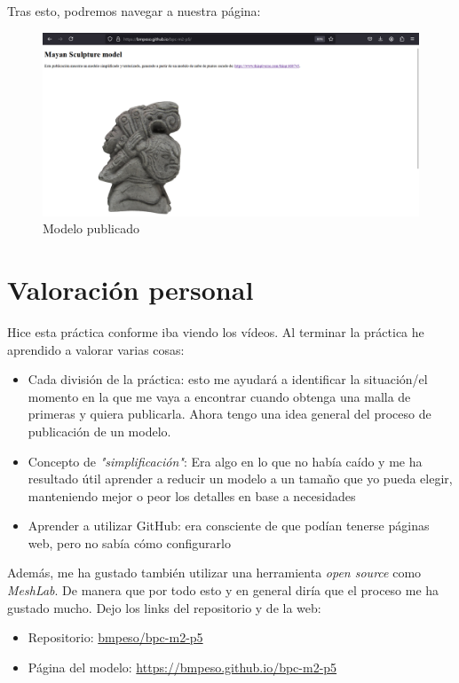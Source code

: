 \documentclass[options]{article}
\begin{document}
Tras esto, podremos navegar a nuestra página:

\begin{figure}[H]
    \centering
    \includegraphics[scale=0.34]{images/publicacion_03.png}
    \caption{Modelo publicado}
\end{figure}
\pagebreak
\section{Valoración personal}

Hice esta práctica conforme iba viendo los vídeos. Al terminar la práctica he aprendido a valorar varias cosas:
\begin{itemize}
    \item Cada división de la práctica: esto me ayudará a identificar la situación/el momento en la que me vaya a encontrar cuando obtenga una malla de primeras y quiera publicarla. Ahora tengo una idea general del proceso de publicación de un modelo.
    \item Concepto de \textit{"simplificación"}: Era algo en lo que no había caído y me ha resultado útil aprender a reducir un modelo a un tamaño que yo pueda elegir, manteniendo mejor o peor los detalles en base a necesidades
    \item Aprender a utilizar GitHub: era consciente de que podían tenerse páginas web, pero no sabía cómo configurarlo
\end{itemize}

Además, me ha gustado también utilizar una herramienta \textit{open source} como \textit{MeshLab}. De manera que por todo esto y en general diría que el proceso me ha gustado mucho. Dejo los links del repositorio y de la web:

\begin{itemize}
    \item Repositorio: \href{https://github.com/bmpeso/bpc-m2-p5}{bmpeso/bpc-m2-p5}
    \item Página del modelo: \href{https://bmpeso.github.io/bpc-m2-p5/}{https://bmpeso.github.io/bpc-m2-p5}
\end{itemize}
\end{document}

